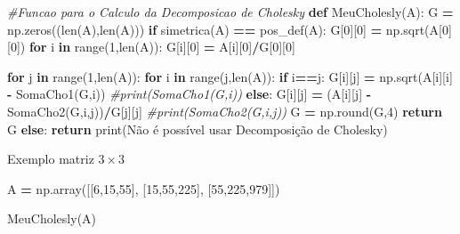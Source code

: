 \documentclass[
]{book}
\newenvironment{Shaded}{\begin{snugshade}}{\end{snugshade}}
\newcommand{\BuiltInTok}[1]{#1}
\newcommand{\CommentTok}[1]{\textcolor[rgb]{0.56,0.35,0.01}{\textit{#1}}}
\newcommand{\ControlFlowTok}[1]{\textcolor[rgb]{0.13,0.29,0.53}{\textbf{#1}}}
\newcommand{\DecValTok}[1]{\textcolor[rgb]{0.00,0.00,0.81}{#1}}
\newcommand{\KeywordTok}[1]{\textcolor[rgb]{0.13,0.29,0.53}{\textbf{#1}}}
\newcommand{\NormalTok}[1]{#1}
\newcommand{\OperatorTok}[1]{\textcolor[rgb]{0.81,0.36,0.00}{\textbf{#1}}}
\newcommand{\StringTok}[1]{\textcolor[rgb]{0.31,0.60,0.02}{#1}}
\begin{document}
\begin{Shaded}
\begin{Highlighting}[]
\CommentTok{\#Funcao para o Calculo da Decomposicao de Cholesky}
\KeywordTok{def}\NormalTok{ MeuCholesly(A):}
\NormalTok{  G }\OperatorTok{=}\NormalTok{ np.zeros((}\BuiltInTok{len}\NormalTok{(A),}\BuiltInTok{len}\NormalTok{(A)))}
  \ControlFlowTok{if}\NormalTok{ simetrica(A) }\OperatorTok{==}\NormalTok{ pos\_def(A):}
\NormalTok{    G[}\DecValTok{0}\NormalTok{][}\DecValTok{0}\NormalTok{] }\OperatorTok{=}\NormalTok{ np.sqrt(A[}\DecValTok{0}\NormalTok{][}\DecValTok{0}\NormalTok{])}
    \ControlFlowTok{for}\NormalTok{ i }\KeywordTok{in} \BuiltInTok{range}\NormalTok{(}\DecValTok{1}\NormalTok{,}\BuiltInTok{len}\NormalTok{(A)):}
\NormalTok{      G[i][}\DecValTok{0}\NormalTok{] }\OperatorTok{=}\NormalTok{ A[i][}\DecValTok{0}\NormalTok{]}\OperatorTok{/}\NormalTok{G[}\DecValTok{0}\NormalTok{][}\DecValTok{0}\NormalTok{]}
    
    \ControlFlowTok{for}\NormalTok{ j }\KeywordTok{in} \BuiltInTok{range}\NormalTok{(}\DecValTok{1}\NormalTok{,}\BuiltInTok{len}\NormalTok{(A)):}
      \ControlFlowTok{for}\NormalTok{ i }\KeywordTok{in} \BuiltInTok{range}\NormalTok{(j,}\BuiltInTok{len}\NormalTok{(A)):}
        \ControlFlowTok{if}\NormalTok{ i}\OperatorTok{==}\NormalTok{j:}
\NormalTok{          G[i][j] }\OperatorTok{=}\NormalTok{ np.sqrt(A[i][i] }\OperatorTok{{-}}\NormalTok{ SomaCho1(G,i))}
          \CommentTok{\#print(SomaCho1(G,i))}
        \ControlFlowTok{else}\NormalTok{:}
\NormalTok{          G[i][j] }\OperatorTok{=}\NormalTok{ (A[i][j] }\OperatorTok{{-}}\NormalTok{ SomaCho2(G,i,j))}\OperatorTok{/}\NormalTok{G[j][j]}
          \CommentTok{\#print(SomaCho2(G,i,j))}
\NormalTok{    G }\OperatorTok{=}\NormalTok{ np.}\BuiltInTok{round}\NormalTok{(G,}\DecValTok{4}\NormalTok{)}
    \ControlFlowTok{return}\NormalTok{ G }
  \ControlFlowTok{else}\NormalTok{:}
    \ControlFlowTok{return} \BuiltInTok{print}\NormalTok{(}\StringTok{\textquotesingle{}Não é possível usar Decomposição de Cholesky\textquotesingle{}}\NormalTok{)}
\end{Highlighting}
\end{Shaded}

Exemplo matriz \(3 \times 3\)

\begin{Shaded}
\begin{Highlighting}[]

\NormalTok{A }\OperatorTok{=}\NormalTok{ np.array([[}\DecValTok{6}\NormalTok{,}\DecValTok{15}\NormalTok{,}\DecValTok{55}\NormalTok{],}
\NormalTok{              [}\DecValTok{15}\NormalTok{,}\DecValTok{55}\NormalTok{,}\DecValTok{225}\NormalTok{],}
\NormalTok{              [}\DecValTok{55}\NormalTok{,}\DecValTok{225}\NormalTok{,}\DecValTok{979}\NormalTok{]])}

\NormalTok{MeuCholesly(A)}
\end{Highlighting}
\end{Shaded}
\end{document}
